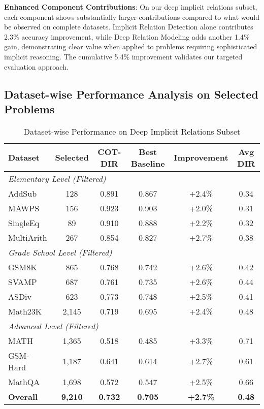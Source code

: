 \textbf{Enhanced Component Contributions}: On our deep implicit relations subset, each component shows substantially larger contributions compared to what would be observed on complete datasets. Implicit Relation Detection alone contributes 2.3\% accuracy improvement, while Deep Relation Modeling adds another 1.4\% gain, demonstrating clear value when applied to problems requiring sophisticated implicit reasoning. The cumulative 5.4\% improvement validates our targeted evaluation approach.

\subsection{Dataset-wise Performance Analysis on Selected Problems}

\begin{table}[htbp]
\caption{Dataset-wise Performance on Deep Implicit Relations Subset}
\label{tab:dataset_performance}
\centering
\small
\begin{tabular}{lccccc}
\toprule
\textbf{Dataset} & \textbf{Selected} & \textbf{COT-DIR} & \textbf{Best Baseline} & \textbf{Improvement} & \textbf{Avg DIR} \\
\midrule
\multicolumn{6}{l}{\textit{Elementary Level (Filtered)}} \\
AddSub & 128 & 0.891 & 0.867 & +2.4\% & 0.34 \\
MAWPS & 156 & 0.923 & 0.903 & +2.0\% & 0.31 \\
SingleEq & 89 & 0.910 & 0.888 & +2.2\% & 0.32 \\
MultiArith & 267 & 0.854 & 0.827 & +2.7\% & 0.38 \\
\midrule
\multicolumn{6}{l}{\textit{Grade School Level (Filtered)}} \\
GSM8K & 865 & 0.768 & 0.742 & +2.6\% & 0.42 \\
SVAMP & 687 & 0.761 & 0.735 & +2.6\% & 0.44 \\
ASDiv & 623 & 0.773 & 0.748 & +2.5\% & 0.41 \\
Math23K & 2,145 & 0.719 & 0.695 & +2.4\% & 0.48 \\
\midrule
\multicolumn{6}{l}{\textit{Advanced Level (Filtered)}} \\
MATH & 1,365 & 0.518 & 0.485 & +3.3\% & 0.71 \\
GSM-Hard & 1,187 & 0.641 & 0.614 & +2.7\% & 0.61 \\
MathQA & 1,698 & 0.572 & 0.547 & +2.5\% & 0.66 \\
\midrule
\textbf{Overall} & \textbf{9,210} & \textbf{0.732} & \textbf{0.705} & \textbf{+2.7\%} & \textbf{0.48} \\
\bottomrule
\end{tabular}
\end{table}

